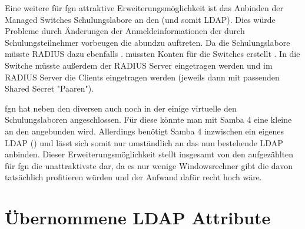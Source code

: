 \documentclass[11pt,a4paper,titlepage=firstiscover]{scrartcl} %
\begin{document}
Eine weitere für fgn attraktive Erweiterungsmöglichkeit ist das Anbinden der 
Managed Switches  Schulungslabore an den 
 (und somit  LDAP). Dies würde Probleme durch 
Änderungen der Anmeldeinformationen der  durch 
Schulungsteilnehmer vorbeugen die abundzu auftreten.  Da die Schulungslabore  müsste RADIUS dazu ebenfalls .  
müssten Konten für die Switches erstellt  . In die Switche müsste außerdem der 
RADIUS Server eingetragen werden und im RADIUS Server die Clients eingetragen 
werden (jeweils dann mit passenden Shared Secret "Paaren").

fgn hat neben den diversen  auch noch  
 in der  einige virtuelle 
  den Schulungslaboren angeschlossen. Für 
diese könnte man mit Samba 4 eine kleine  
 an den  angebunden wird. Allerdings 
benötigt Samba 4 inzwischen ein eigenes LDAP () und lässt sich 
somit nur umständlich an das nun bestehende LDAP anbinden. Dieser 
Erweiterungsmöglichkeit stellt insgesamt von den aufgezählten für fgn die 
unattraktivste dar, da es nur wenige Windowsrechner gibt die davon tatsächlich 
profitieren würden und der Aufwand dafür recht hoch wäre. 


\appendix
\newpage
{} %
\section{Übernommene LDAP Attribute} \label{sec:LDAP-Attribute}
\newpage
\end{document}

